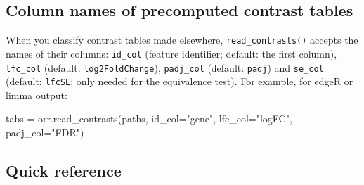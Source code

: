 \documentclass[11pt,a4paper]{article}
\newcommand{\code}[1]{\texttt{\color{navy!85!black}#1}}
\begin{document}
\subsection{Column names of precomputed contrast tables}

When you classify contrast tables made elsewhere, \code{read\_contrasts()} accepts the names of
their columns: \code{id\_col} (feature identifier; default: the first column), \code{lfc\_col}
(default: \code{log2FoldChange}), \code{padj\_col} (default: \code{padj}) and \code{se\_col}
(default: \code{lfcSE}; only needed for the equivalence test). For example, for edgeR or limma output:

\begin{pycode}
tabs = orr.read_contrasts(paths, id_col="gene", lfc_col="logFC", padj_col="FDR")
\end{pycode}

\subsection{Quick reference}
\end{document}
